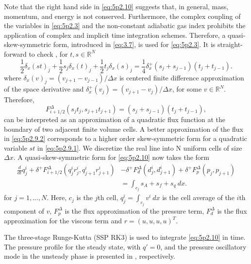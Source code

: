 Note that the right hand side in \eqref{eq:5p2.10} suggests that, in general, mass, momentum, and energy is not conserved. Furthermore, the complex coupling of the variables in \eqref{eq:5p2.3} and the non-constant adiabatic gas index prohibits the application of complex and implicit time integration schemes. Therefore, a quasi-skew-symmetric form, introduced in \eqref{eq:3.7}, is used for \eqref{eq:5p2.3}. It is straight-forward to check \cite{sjogreen2010skew}, for $t,s\in \mathbb R^{N}$
\begin{equation} \label{eq:5p2.9.1}
	\frac 1 2 \delta_x (st)_j + \frac 1 2 s_j \delta_x (t)_j + \frac 1 2 t_j \delta_x (s)_j = \frac 1 4 \delta_x^+( s_j + s_{j-1} )(t_j + t_{j-1}).
\end{equation}
where $\delta_x (v)_j = \left( v_{j+1} - v_{j-1} \right)/\Delta x$ is centered finite difference approximation of the space derivative and $\delta_x^+ (v_j) = \left( v_{j+1} - v_j \right) /\Delta x$, for some $v\in \mathbb R^{N}$. Therefore,
\begin{equation} \label{eq:5p2.9.2}
	F_{i+1/2}^{\Delta}(s_jt_j,s_{j+1}t_{j+1}) = ( s_j + s_{j-1} )(t_j + t_{j-1}),
\end{equation}
can be interpreted as an approximation of a quadratic flux function at the boundary of two adjacent finite volume cells. A better approximation of the flux in \eqref{eq:5p2.9.2} corresponds to a higher order skew-symmetric form for a quadratic variable $st$ in \eqref{eq:5p2.9.1}. We discretize the real line into N uniform cells of size $\Delta x$. A quasi-skew-symmetric form for \eqref{eq:5p2.10} now takes the form
\begin{equation}
\begin{aligned}
	\frac{d}{dt} q^i_j + \delta^+ F^{\Delta}_{i+1/2}(q^i_jr^i_j,q^i_{j+1}r^i_{j+1}) &- \delta^+ F_d^{\Delta}(d^i_j,d^i_{j+1}) + \delta^+ F_p^{\Delta}(p_j,p_{j+1}) \\
	&= \int_{c_j} s_A + s_f + s_q \ dx.
\end{aligned}
\end{equation}
for $j=1,\dots,N$. Here, $c_j$ is the $j$th cell, $q^i_j = \int_{c_j} v^i \ dx$ is the cell average of the $i$th component of $v$, $F^{\Delta}_p$ is the flux approximation of the pressure term, $F^{\Delta}_d$ is the flux approximation for the viscous term and $r = ( u , u , u , u )^T$.




The three-stage Runge-Kutta (SSP RK3) \cite{jiang1996efficient} is used to integrate \eqref{eq:5p2.10} in time.
The pressure profile for the steady state, with $q'=0$, and the pressure oscillatory mode in the unsteady phase is presented in , respectively.

